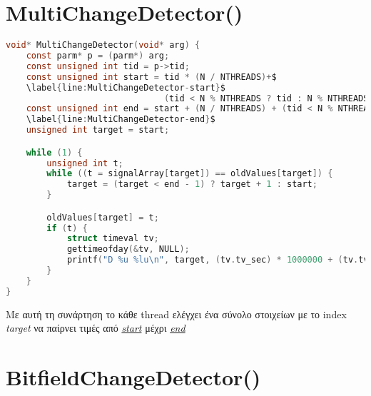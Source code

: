 \section{MultiChangeDetector()}

\begin{lstlisting}[language=c, caption={MultiChangeDetector()}, escapechar=$]
void* MultiChangeDetector(void* arg) {
    const parm* p = (parm*) arg;
    const unsigned int tid = p->tid;
    const unsigned int start = tid * (N / NTHREADS)+$    
    \label{line:MultiChangeDetector-start}$
                               (tid < N % NTHREADS ? tid : N % NTHREADS);
    const unsigned int end = start + (N / NTHREADS) + (tid < N % NTHREADS);$
    \label{line:MultiChangeDetector-end}$
    unsigned int target = start;

    while (1) {
        unsigned int t;
        while ((t = signalArray[target]) == oldValues[target]) {
            target = (target < end - 1) ? target + 1 : start;
        }

        oldValues[target] = t;
        if (t) {
            struct timeval tv;
            gettimeofday(&tv, NULL);
            printf("D %u %lu\n", target, (tv.tv_sec) * 1000000 + (tv.tv_usec));
        }
    }
}
\end{lstlisting}

Με αυτή τη συνάρτηση το κάθε thread ελέγχει ένα σύνολο στοιχείων με το index 
\textit{target} να παίρνει τιμές από 
\hyperref[line:MultiChangeDetector-start]{\textit{start}} μέχρι 
\hyperref[line:MultiChangeDetector-end]{\textit{end}}

\section{BitfieldChangeDetector()}

